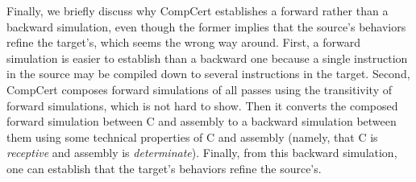 Finally, we briefly discuss why CompCert establishes a forward
rather than a backward simulation, even though the former implies that
the source's behaviors refine the target's, which seems the wrong way
around.  First, a forward simulation is easier to establish than a
backward one because a single instruction in the source may be
compiled down to several instructions in the target. Second, CompCert
composes forward simulations of all passes using the transitivity of
forward simulations, which is not hard to show. Then it converts the
composed forward simulation between C and assembly to a backward
simulation between them using some technical properties of C and
assembly (namely, that C is \emph{receptive} and assembly is
\emph{determinate}). Finally, from this backward simulation, one can
establish that the target's behaviors refine the source's.



%

